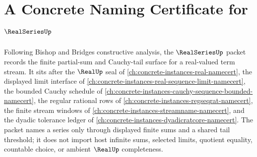 \chapter{A Concrete Naming Certificate for $\RealSeriesUp$}
\label{ch:concrete-instances-realseries-namecert}

Following Bishop and Bridges constructive analysis, the $\RealSeriesUp$ packet records the finite partial-sum and Cauchy-tail surface for a real-valued term stream. It sits after the $\RealUp$ seal of \autoref{ch:concrete-instances-real-namecert}, the displayed limit interface of \autoref{ch:concrete-instances-real-sequence-limit-namecert}, the bounded Cauchy schedule of \autoref{ch:concrete-instances-cauchy-sequence-bounded-namecert}, the regular rational rows of \autoref{ch:concrete-instances-regseqrat-namecert}, the finite stream windows of \autoref{ch:concrete-instances-streamname-namecert}, and the dyadic tolerance ledger of \autoref{ch:concrete-instances-dyadicratcore-namecert}. The packet names a series only through displayed finite sums and a shared tail threshold; it does not import host infinite sums, selected limits, quotient equality, countable choice, or ambient $\RealUp$ completeness.

